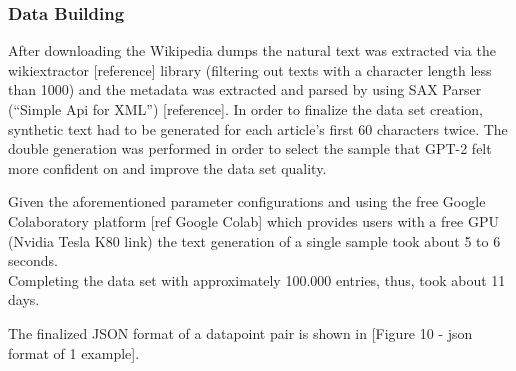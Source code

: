 \subsubsection{Data Building}
\label{sub:data_building}

After downloading the Wikipedia dumps the natural text was extracted via the wikiextractor [reference] library (filtering out 
texts with a character length less than 1000) and the metadata was extracted and parsed by using SAX Parser (“Simple Api for XML”) 
[reference]. In order to finalize the data set creation, synthetic text had to be generated for each article’s first 60 characters twice. 
The double generation was performed in order to select the sample that GPT-2 felt more confident on and improve the data set quality.

Given the aforementioned parameter configurations and using the free Google Colaboratory platform [ref Google Colab] which provides 
users with a free GPU (Nvidia Tesla K80 link) the text generation of a single sample took about 5 to 6 seconds. \\
Completing the data set with approximately 100.000 entries, thus, took about 11 days.

The finalized JSON format of a datapoint pair is shown in [Figure 10 - json format of 1 example]. \\
